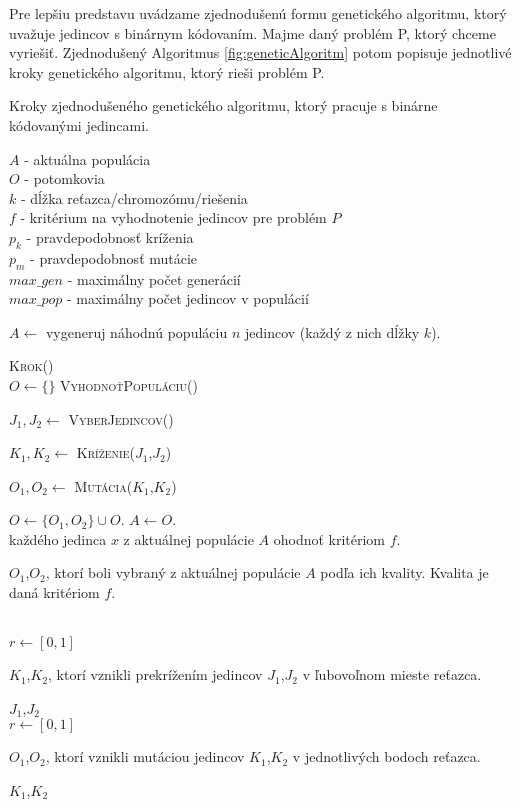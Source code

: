 Pre lepšiu predstavu uvádzame zjednodušenú formu genetického algoritmu, ktorý uvažuje jedincov s binárnym kódovaním. Majme daný problém P, ktorý chceme vyriešiť. Zjednodušený Algoritmus \ref{fig:geneticAlgoritm} potom popisuje jednotlivé kroky genetického algoritmu, ktorý rieši problém P.
\begin{algorithm}
\caption{Kroky zjednodušeného genetického algoritmu, ktorý pracuje s binárne kódovanými jedincami.}\label{fig:geneticAlgoritm}
$A$ - aktuálna populácia \\
$O$ - potomkovia \\
$k$ - dĺžka reťazca/chromozómu/riešenia \\
$f$ - kritérium na vyhodnotenie jedincov pre problém $P$\\
$p_{k}$ - pravdepodobnosť kríženia \\
$p_{m}$ - pravdepodobnosť mutácie \\
$max\_gen$ - maximálny počet generácií \\
$max\_pop$ - maximálny počet jedincov v populácií \\
\begin{algorithmic}

\State \parbox[t]{400pt}{$A \gets $ vygeneruj náhodnú populáciu $n$ jedincov (každý z nich dĺžky $k$).}

	\State \textsc{Krok()}
\EndFor
\\
	\State $O \gets \{\}$
	\State \textsc{VyhodnoťPopuláciu()}
		\State \parbox[t]{350pt}{$J_1,J_2 \gets $ \textsc{VyberJedincov()}}
		\State \parbox[t]{350pt}{$K_1,K_2 \gets $ \textsc{Kríženie($J_1$,$J_2$)}}
		\State \parbox[t]{350pt}{$O_1,O_2 \gets $ \textsc{Mutácia($K_1$,$K_2$)}}
		\State $O \gets \{O_1,O_2\} \cup O$.
	\EndWhile
	\State $A \gets O$.
\EndProcedure
\\
\State každého jedinca $x$ z aktuálnej populácie $A$ ohodnoť kritériom $f$.
\EndProcedure
\\
\State \Return \parbox[t]{300pt}{$O_1$,$O_2$, ktorí boli vybraný z aktuálnej populácie $A$ podľa ich kvality. Kvalita je daná kritériom $f$.}
\EndFunction
\\
\State $r \gets [0,1]$
	\State \Return \parbox[t]{300pt}{$K_1$,$K_2$, ktorí vznikli prekrížením jedincov $J_1$,$J_2$ v ľubovoľnom mieste reťazca.}
	\Else 
	\State \Return $J_1$,$J_2$
\EndIf 
\EndFunction
\\
\State $r \gets [0,1]$
	\State \Return \parbox[t]{300pt}{$O_1$,$O_2$, ktorí vznikli mutáciou jedincov $K_1$,$K_2$ v jednotlivých bodoch reťazca.}
	\Else 
	\State \Return $K_1$,$K_2$
\EndIf 
\EndFunction
\end{algorithmic}
\end{algorithm}


